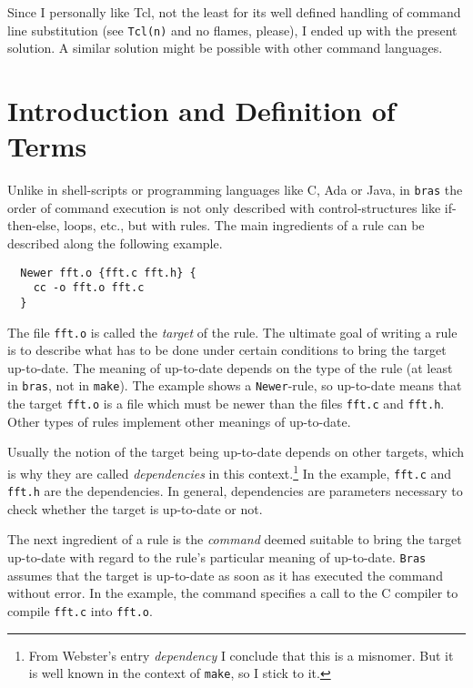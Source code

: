 \documentclass[12pt]{article}
\newcommand{\bras}{\texttt{bras}}
\newcommand{\Bras}{\texttt{Bras}}
\newcommand{\make}{\texttt{make}}
\begin{document}
Since I personally like Tcl, not the least for its well defined
handling of command line substitution (see \texttt{Tcl(n)} and no
flames, please), I ended up with the present solution. A similar
solution might be possible with other command languages.


\section{Introduction and Definition of Terms}
\label{SecDefTerms}

Unlike in shell-scripts or programming languages like C, Ada or Java,
in \bras{} the order of command execution is not only described with
control-structures like if-then-else, loops, etc., but with rules.
The main ingredients of a rule can be described along the following
example.

\begin{verbatim}
  Newer fft.o {fft.c fft.h} {
    cc -o fft.o fft.c
  }
\end{verbatim}

The file \texttt{fft.o} is called the \textit{target} of the rule. The
ultimate goal of writing a rule is to describe what has to be done
under certain conditions to bring the target up-to-date. The meaning
of up-to-date depends on the type of the rule (at least in
\bras{}, not in \make{}). The example shows a \texttt{Newer}-rule, so
up-to-date means that the target \texttt{fft.o} is a file which must
be newer than the files \texttt{fft.c} and \texttt{fft.h}.  Other
types of rules implement other meanings of up-to-date.

Usually the notion of the target being up-to-date depends on other
targets, which is why they are called \textit{dependencies} in this
context.\footnote{From Webster's entry \textit{dependency} I conclude
that this is a misnomer. But it is well known in the context of
\make{}, so I stick to it.} In the example,
\texttt{fft.c} and \texttt{fft.h} are the dependencies. In general,
dependencies are parameters necessary to check whether the
target is up-to-date or not.

The next ingredient of a rule is the \textit{command} deemed suitable
to bring the target up-to-date with regard to the rule's particular
meaning of up-to-date. \Bras{} assumes that the target
is up-to-date as soon as it has executed the command without error. In
the example, the command specifies a call to the C compiler to compile
\texttt{fft.c} into \texttt{fft.o}.
\end{document}
